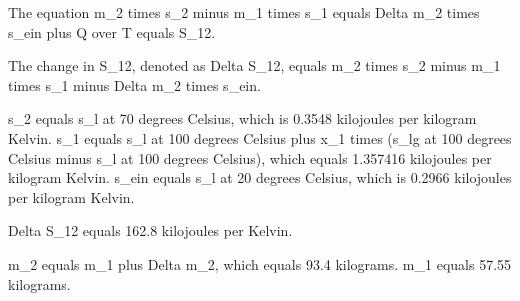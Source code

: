 The equation m_2 times s_2 minus m_1 times s_1 equals Delta m_2 times s_ein plus Q over T equals S_12.

The change in S_12, denoted as Delta S_12, equals m_2 times s_2 minus m_1 times s_1 minus Delta m_2 times s_ein.

s_2 equals s_l at 70 degrees Celsius, which is 0.3548 kilojoules per kilogram Kelvin.
s_1 equals s_l at 100 degrees Celsius plus x_1 times (s_lg at 100 degrees Celsius minus s_l at 100 degrees Celsius), which equals 1.357416 kilojoules per kilogram Kelvin.
s_ein equals s_l at 20 degrees Celsius, which is 0.2966 kilojoules per kilogram Kelvin.

Delta S_12 equals 162.8 kilojoules per Kelvin.

m_2 equals m_1 plus Delta m_2, which equals 93.4 kilograms.
m_1 equals 57.55 kilograms.